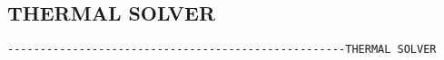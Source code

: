 
\subsection{THERMAL SOLVER}
\begin{verbatim}
----------------------------------------------------THERMAL SOLVER
\end{verbatim}

